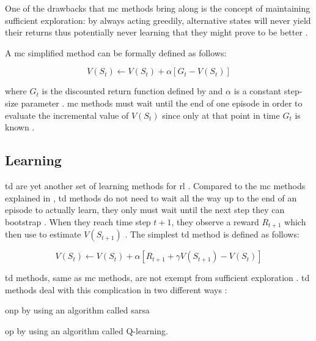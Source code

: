 \documentclass[draft=false]{seal_thesis}
\begin{document}
One of the drawbacks that \gls{mc} methods bring along is the concept of maintaining sufficient exploration: by always acting greedily, alternative states will never yield their returns thus potentially never learning that they might prove to be better \citep[p. 123]{Sutton2017}.

A \gls{mc} simplified method can be formally defined as follows:

\begin{equation}
\label{eq:mc_update}
	V(S_t) \leftarrow V(S_t) + \alpha [G_t - V(S_t)]
\end{equation}

where $G_t$ is the discounted return function defined by  and $\alpha$ is a constant step-size parameter \citep[p. 127]{Sutton2017}. \gls{mc} methods must wait until the end of one episode in order to evaluate the incremental value of $V(S_t)$ since only at that point in time $G_t$ is known \citep[p. 128]{Sutton2017}.

\subsection{ Learning}
\label{subsec:td_learning}

\gls{td} are yet another set of learning methods for \gls{rl} \citep{Sutton2017}. Compared to the \gls{mc} methods explained in , \gls{td} methods do not need to wait all the way up to the end of an episode to actually learn, they only must wait until the next step \ie they can bootstrap \citep[p. 128]{Sutton2017}. When they reach time step $t+1$, they observe a reward $R_{t+1}$ which then use to estimate $V(S_{t+1})$ \citep[p. 128]{Sutton2017}. The simplest \gls{td} method is defined as follows:

\begin{equation}
\label{eq:td_update}
	V(S_t) \leftarrow V(S_t) + \alpha [R_{t+1} + \gamma V(S_{t+1}) - V(S_t)]
\end{equation}

\gls{td} methods, same as \gls{mc} methods, are not exempt from sufficient exploration \citep[p. 147]{Sutton2017}. \gls{td} methods deal with this complication in two different ways \citep[p. 128]{Sutton2017}:
\begin{enumerate*}
	\item \gls{onp} by using an algorithm called \gls{sarsa}
	\item \gls{op} by using an algorithm called Q-learning.
\end{enumerate*}
\end{document}
